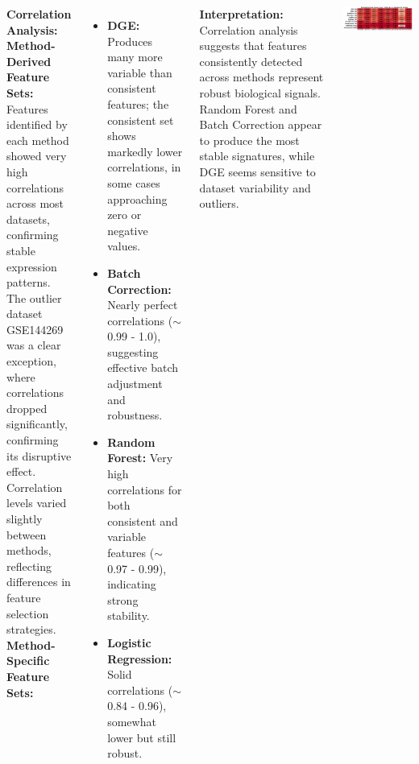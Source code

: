 \begin{columns}
{\begin{minipage}{20cm}
\end{minipage}
\vspace{0.5cm}
\begin{minipage}{0.6\textwidth}
\textbf{Correlation Analysis:}\\[0.25em]
\textbf{Method-Derived Feature Sets:}\\
Features identified by each method showed very high correlations across most datasets, confirming stable expression patterns.\\The outlier dataset GSE144269 was a clear exception, where correlations dropped significantly, confirming its disruptive effect.\\Correlation levels varied slightly between methods, reflecting differences in feature selection strategies.\\[0.5em]
\textbf{Method-Specific Feature Sets:} %
\begin{itemize}
\item \textbf{DGE:} Produces many more variable than consistent features; the consistent set shows markedly lower correlations, in some cases approaching zero or negative values.
\item \textbf{Batch Correction:} Nearly perfect correlations ($\sim$ 0.99 - 1.0), suggesting effective batch adjustment and robustness.
\item \textbf{Random Forest:} Very high correlations for both consistent and variable features ($\sim$ 0.97 - 0.99), indicating strong stability.
\item \textbf{Logistic Regression:} Solid correlations ($\sim$ 0.84 - 0.96), somewhat lower but still robust.
\end{itemize}
\vspace{0.25em} \textbf{Interpretation:}
Correlation analysis suggests that features consistently detected across methods represent robust biological signals. Random Forest and Batch Correction appear to produce the most stable signatures, while DGE seems sensitive to dataset variability and outliers.
\end{minipage}
\hfill
\begin{minipage}{25cm}
	\includegraphics[width=25cm]{correlation_method.png}

\end{minipage}}
\end{columns}
